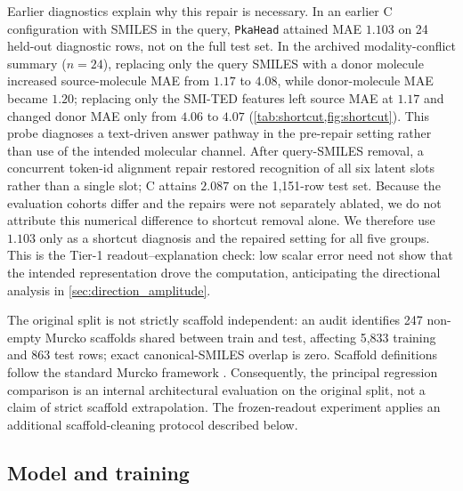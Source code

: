 \documentclass[11pt]{article}
\begin{document}
Earlier diagnostics explain why this repair is necessary. In an earlier C configuration with SMILES in the query, \texttt{PkaHead} attained MAE $1.103$ on 24 held-out diagnostic rows, not on the full test set. In the archived modality-conflict summary ($n=24$), replacing only the query SMILES with a donor molecule increased source-molecule MAE from $1.17$ to $4.08$, while donor-molecule MAE became $1.20$; replacing only the SMI-TED features left source MAE at $1.17$ and changed donor MAE only from $4.06$ to $4.07$ (\cref{tab:shortcut,fig:shortcut}). This probe diagnoses a text-driven answer pathway in the pre-repair setting rather than use of the intended molecular channel. After query-SMILES removal, a concurrent token-id alignment repair restored recognition of all six latent slots rather than a single slot; C attains $2.087$ on the 1{,}151-row test set. Because the evaluation cohorts differ and the repairs were not separately ablated, we do not attribute this numerical difference to shortcut removal alone. We therefore use $1.103$ only as a shortcut diagnosis and the repaired setting for all five groups. This is the Tier-1 readout--explanation check: low scalar error need not show that the intended representation drove the computation, anticipating the directional analysis in \cref{sec:direction_amplitude}.

The original split is not strictly scaffold independent: an audit identifies 247 non-empty Murcko scaffolds shared between train and test, affecting 5{,}833 training and 863 test rows; exact canonical-SMILES overlap is zero. Scaffold definitions follow the standard Murcko framework \citep{Bemis1996Properties}. Consequently, the principal regression comparison is an internal architectural evaluation on the original split, not a claim of strict scaffold extrapolation. The frozen-readout experiment applies an additional scaffold-cleaning protocol described below.

\subsection{Model and training}
\label{sec:model_training}
\end{document}
